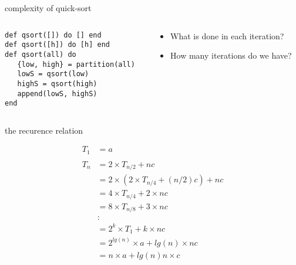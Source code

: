 \begin{frame}[fragile]{complexity of quick-sort}

\begin{columns}
   \begin{column}{.5\linewidth}
    \begin{verbatim}
def qsort([]) do [] end
def qsort([h]) do [h] end
def qsort(all) do 
   {low, high} = partition(all)
   lowS = qsort(low)
   highS = qsort(high)
   append(lowS, highS)
end
    \end{verbatim}
   \end{column}
   \begin{column}{.5\linewidth}
    \begin{itemize}
      \pause \item What is done in each iteration?
      \pause \item How many iterations do we have?       
    \end{itemize}
   \end{column}
\end{columns}


\end{frame}

\begin{frame}{the recurence relation}

\begin{equation}  
\begin{split}
    T_1 & = a \\
\\
T_n & = 2 \times T_{n/2} + nc \\ 
    & = 2 \times ( 2 \times T_{n/4} + (n/2)c ) + nc \\
    & = 4 \times T_{n/4} + 2 \times nc\\
    & = 8 \times T_{n/8} + 3 \times nc\\
    & : \\
    & = 2^k \times T_1 + k \times nc \\
    & = 2^{lg(n)} \times a  + lg(n) \times nc \\
    & = n \times a + lg(n)n \times c\\
  \end{split}
\end{equation}

\end{frame}


